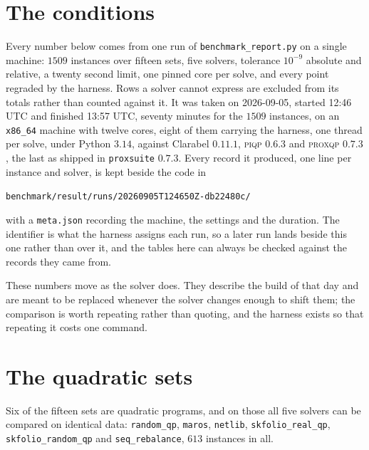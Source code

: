 \documentclass[a4paper,11pt]{book}
\theoremstyle{plain}
\theoremstyle{definition}
\theoremstyle{remark}
\numberwithin{equation}{chapter}
\numberwithin{algorithm}{chapter}
\begin{document}
	\section{The conditions}

	Every number below comes from one run of \texttt{benchmark\_report.py} on a
	single machine: $1509$ instances over fifteen sets, five solvers, tolerance
	$10^{-9}$ absolute and relative, a twenty second limit, one pinned core per
	solve, and every point regraded by the harness. Rows a solver cannot express
	are excluded from its totals rather than counted against it.
 It was taken on
	2026-09-05, started 12:46 UTC and finished 13:57 UTC, seventy minutes for the
	$1509$ instances, on an \texttt{x86\_64} machine with twelve cores, eight of
	them carrying the harness, one thread per solve, under Python $3.14$, against
	Clarabel $0.11.1$, \textsc{piqp} $0.6.3$ and \textsc{proxqp} $0.7.3$, the
	last as shipped in \texttt{proxsuite} $0.7.3$. Every record it produced, one
	line per instance and solver, is kept beside the code in

	\begin{center}
		\texttt{benchmark/result/runs/20260905T124650Z-db22480c/}
	\end{center}

	with a \texttt{meta.json} recording the machine, the settings and the
	duration. The identifier is what the harness assigns each run, so a later run
	lands beside this one rather than over it, and the tables here can always be
	checked against the records they came from.

	These numbers move as the solver does. They describe the build of that day and
	are meant to be replaced whenever the solver changes enough to shift them; the
	comparison is worth repeating rather than quoting, and the harness exists so
	that repeating it costs one command.



	\section{The quadratic sets}

	Six of the fifteen sets are quadratic programs, and on those all five solvers
	can be compared on identical data: \texttt{random\_qp}, \texttt{maros},
	\texttt{netlib}, \texttt{skfolio\_real\_qp}, \texttt{skfolio\_random\_qp} and
	\texttt{seq\_rebalance}, $613$ instances in all.
\end{document}
